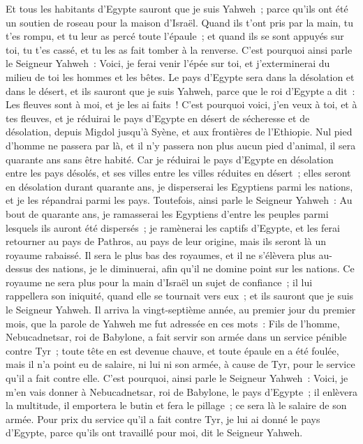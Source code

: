 \begin{multicols}{2}
Et tous les habitants d'Egypte sauront que je suis Yahweh~; parce qu'ils ont été un soutien de roseau pour la maison d'Israël.
Quand ils t'ont pris par la main, tu t'es rompu, et tu leur as percé toute l'épaule~; et quand ils se sont appuyés sur toi, tu t'es cassé, et tu les as fait tomber à la renverse.
C'est pourquoi ainsi parle le Seigneur Yahweh~: Voici, je ferai venir l'épée sur toi, et j'exterminerai du milieu de toi les hommes et les bêtes.
Le pays d'Egypte sera dans la désolation et dans le désert, et ils sauront que je suis Yahweh, parce que le roi d'Egypte a dit~: Les fleuves sont à moi, et je les ai faits~!
C'est pourquoi voici, j'en veux à toi, et à tes fleuves, et je réduirai le pays d'Egypte en désert de sécheresse et de désolation, depuis Migdol jusqu'à Syène, et aux frontières de l'Ethiopie.
Nul pied d'homme ne passera par là, et il n'y passera non plus aucun pied d'animal, il sera quarante ans sans être habité.
Car je réduirai le pays d'Egypte en désolation entre les pays désolés, et ses villes entre les villes réduites en désert~; elles seront en désolation durant quarante ans, je disperserai les Egyptiens parmi les nations, et je les répandrai parmi les pays.
Toutefois, ainsi parle le Seigneur Yahweh~: Au bout de quarante ans, je ramasserai les Egyptiens d'entre les peuples parmi lesquels ils auront été dispersés~;
je ramènerai les captifs d'Egypte, et les ferai retourner au pays de Pathros, au pays de leur origine, mais ils seront là un royaume rabaissé.
Il sera le plus bas des royaumes, et il ne s'élèvera plus au-dessus des nations, je le diminuerai, afin qu'il ne domine point sur les nations.
Ce royaume ne sera plus pour la main d'Israël un sujet de confiance~; il lui rappellera son iniquité, quand elle se tournait vers eux~; et ils sauront que je suis le Seigneur Yahweh.
Il arriva la vingt-septième année, au premier jour du premier mois, que la parole de Yahweh me fut adressée en ces mots~:
Fils de l'homme, Nebucadnetsar, roi de Babylone, a fait servir son armée dans un service pénible contre Tyr~; toute tête en est devenue chauve, et toute épaule en a été foulée, mais il n'a point eu de salaire, ni lui ni son armée, à cause de Tyr, pour le service qu'il a fait contre elle.
C'est pourquoi, ainsi parle le Seigneur Yahweh~: Voici, je m'en vais donner à Nebucadnetsar, roi de Babylone, le pays d'Egypte~; il enlèvera la multitude, il emportera le butin et fera le pillage~; ce sera là le salaire de son armée.
Pour prix du service qu'il a fait contre Tyr, je lui ai donné le pays d'Egypte, parce qu'ils ont travaillé pour moi, dit le Seigneur Yahweh.

\end{multicols}
